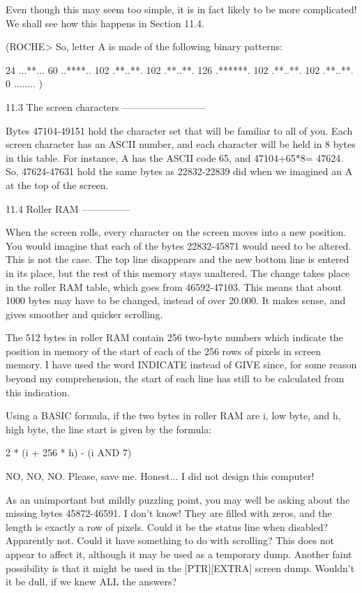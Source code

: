 Even  though  this  may  seem too simple, it is in  fact  likely  to  be  more 
complicated! We shall see how this happens in Section 11.4.

(ROCHE> So, letter A is made of the following binary patterns:

         24        ...**...
         60        ..****..
        102        .**..**.
        102        .**..**.
        126        .******.
        102        .**..**.
        102        .**..**.
          0        ........
)


11.3 The screen characters
--------------------------

Bytes 47104-49151 hold the character set that will be familiar to all of  you. 
Each screen character has an ASCII number, and each character will be held  in 
8 bytes in this table. For instance, A has the ASCII code 65, and  47104+65*8= 
47624. So, 47624-47631 hold the same bytes as 22832-22839 did when we imagined 
an A at the top of the screen.


11.4 Roller RAM
---------------

When  the  screen  rolls,  every character on the  screen  moves  into  a  new 
position.  You would imagine that each of the bytes 22832-45871 would need  to 
be  altered. This is not the case. The top line disappears and the new  bottom 
line is entered in its place, but the rest of this memory stays unaltered. The 
change takes place in the roller RAM table, which goes from 46592-47103.  This 
means that about 1000 bytes may have to be changed, instead of over 20.000. It 
makes sense, and gives smoother and quicker scrolling.

The  512 bytes in roller RAM contain 256 two-byte numbers which  indicate  the 
position  in memory of the start of each of the 256 rows of pixels  in  screen 
memory.  I have used the word INDICATE instead of GIVE since, for some  reason 
beyond  my  comprehension, the start of each line has still to  be  calculated 
from this indication.

Using a BASIC formula, if the two bytes in roller RAM are i, low byte, and  h, 
high byte, the line start is given by the formula:

        2 * (i + 256 * h) - (i AND 7)

NO, NO, NO. Please, save me. Honest... I did not design this computer!

As an unimportant but mildly puzzling point, you may well be asking about  the 
missing  bytes 45872-46591. I don't know! They are filled with zeros, and  the 
length is exactly a row of pixels. Could it be the status line when  disabled? 
Apparently  not. Could it have something to do with scrolling? This  does  not 
appear  to  affect it, although it may be used as a  temporary  dump.  Another 
faint  possibility is that it might be used in the [PTR][EXTRA]  screen  dump. 
Wouldn't it be dull, if we knew ALL the answers?


